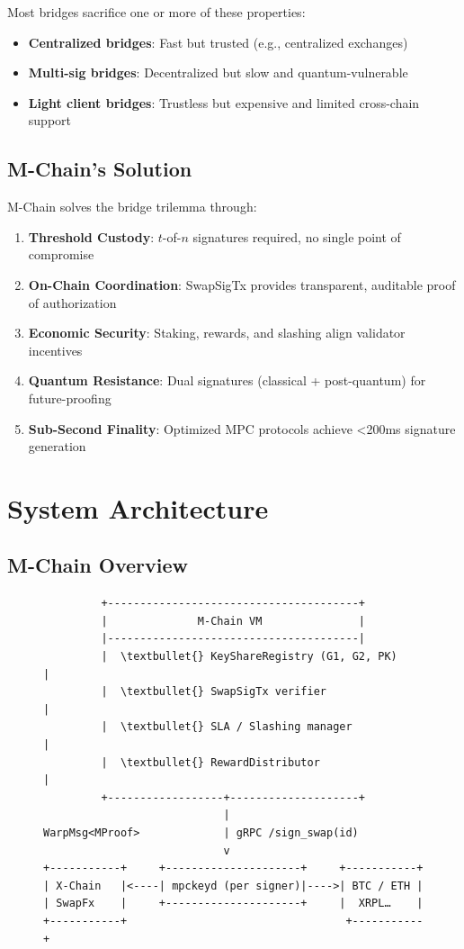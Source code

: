 \documentclass[11pt]{article}
\begin{document}
Most bridges sacrifice one or more of these properties:
\begin{itemize}
\item \textbf{Centralized bridges}: Fast but trusted (e.g., centralized exchanges)
\item \textbf{Multi-sig bridges}: Decentralized but slow and quantum-vulnerable
\item \textbf{Light client bridges}: Trustless but expensive and limited cross-chain support
\end{itemize}

\subsection{M-Chain's Solution}

M-Chain solves the bridge trilemma through:

\begin{enumerate}
\item \textbf{Threshold Custody}: $t$-of-$n$ signatures required, no single point of compromise
\item \textbf{On-Chain Coordination}: SwapSigTx provides transparent, auditable proof of authorization
\item \textbf{Economic Security}: Staking, rewards, and slashing align validator incentives
\item \textbf{Quantum Resistance}: Dual signatures (classical + post-quantum) for future-proofing
\item \textbf{Sub-Second Finality}: Optimized MPC protocols achieve <200ms signature generation
\end{enumerate}

\section{System Architecture}

\subsection{M-Chain Overview}

\begin{figure}[h]
\centering
\begin{verbatim}
         +---------------------------------------+
         |              M-Chain VM               |
         |---------------------------------------|
         |  \textbullet{} KeyShareRegistry (G1, G2, PK)      |
         |  \textbullet{} SwapSigTx verifier                 |
         |  \textbullet{} SLA / Slashing manager             |
         |  \textbullet{} RewardDistributor                  |
         +------------------+--------------------+
                            |
WarpMsg<MProof>             | gRPC /sign_swap(id)
                            v
+-----------+     +---------------------+     +-----------+
| X-Chain   |<----| mpckeyd (per signer)|---->| BTC / ETH |
| SwapFx    |     +---------------------+     |  XRPL…    |
+-----------+                                  +-----------+
\end{verbatim}

\label{fig:architecture}
\end{figure}
\end{document}
